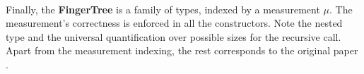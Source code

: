 \documentclass[12pt,twoside,notitlepage]{report}
\begin{document}
\begin{code}
\\
\>  \AgdaSymbol{\{}\AgdaSymbol{\}} \AgdaSymbol{(} \AgdaSymbol{:}  \AgdaSymbol{):}   \<%
\\
\>[0]\<[2]%
\>[2] \<[8]%
\>[8]\AgdaSymbol{:}    \<%
\\
\>[0]\<[2]%
\>[2] \<[8]%
\>[8]\AgdaSymbol{:}      \<%
\\
\>[0]\<[2]%
\>[2] \AgdaSymbol{:}        \<%
\\
\>[0]\<[2]%
\>[2] \<[8]%
\>[8]\AgdaSymbol{:}          \<%
\\
\end{code}

Finally, the \textbf{FingerTree} is a family of types, indexed by a measurement $\mu$. The measurement's correctness is enforced in all the constructors. Note the nested type and the universal quantification over possible sizes for the recursive call. Apart from the measurement indexing, the rest corresponds to the original paper \cite{fingertrees}.
\end{document}
